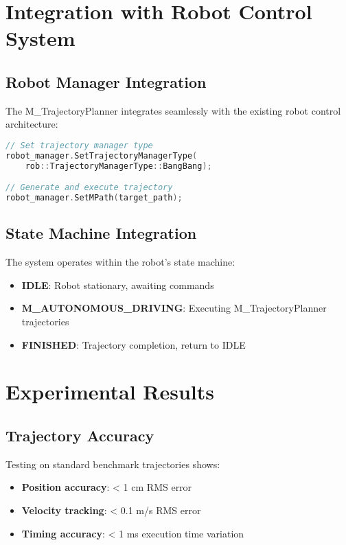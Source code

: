 \documentclass[12pt,a4paper]{article}
\begin{document}
\section{Integration with Robot Control System}

\subsection{Robot Manager Integration}

The M\_TrajectoryPlanner integrates seamlessly with the existing robot control architecture:

\begin{lstlisting}[language=C++, caption=Integration Example]
// Set trajectory manager type
robot_manager.SetTrajectoryManagerType(
    rob::TrajectoryManagerType::BangBang);

// Generate and execute trajectory
robot_manager.SetMPath(target_path);
\end{lstlisting}

\subsection{State Machine Integration}

The system operates within the robot's state machine:

\begin{itemize}
\item \textbf{IDLE}: Robot stationary, awaiting commands
\item \textbf{M\_AUTONOMOUS\_DRIVING}: Executing M\_TrajectoryPlanner trajectories
\item \textbf{FINISHED}: Trajectory completion, return to IDLE
\end{itemize}

\section{Experimental Results}

\subsection{Trajectory Accuracy}

Testing on standard benchmark trajectories shows:

\begin{itemize}
\item \textbf{Position accuracy}: < 1 cm RMS error
\item \textbf{Velocity tracking}: < 0.1 m/s RMS error
\item \textbf{Timing accuracy}: < 1 ms execution time variation
\end{itemize}
\end{document}

